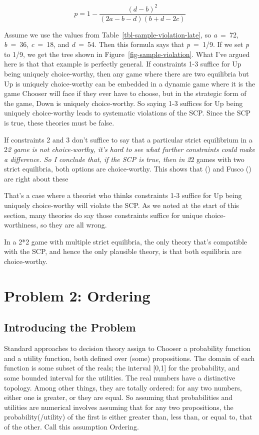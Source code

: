\documentclass[
  10pt,
  letterpaper,
  DIV=11,
  numbers=noendperiod,
  twoside]{scrartcl}
\begin{document}
\[
p = 1 - \frac{(d-b)^2}{(2a-b-d)(b+d-2c)}
\]

Assume we use the values from Table~\ref{tbl-sample-violation-late}, so
\emph{a}~=~72, \emph{b}~=~36, \emph{c}~=~18, and \emph{d}~=~54. Then
this formula says that \emph{p}~=~1/9. If we set \emph{p} to 1/9, we get
the tree shown in Figure~\ref{fig-sample-violation}. What I've argued
here is that that example is perfectly general. If constraints 1-3
suffice for Up being uniquely choice-worthy, then any game where there
are two equilibria but Up is uniquely choice-worthy can be embedded in a
dynamic game where it is the game Chooser will face if they ever have to
choose, but in the strategic form of the game, Down is uniquely
choice-worthy. So saying 1-3 suffices for Up being uniquely
choice-worthy leads to systematic violations of the SCP. Since the SCP
is true, these theories must be false.

If constraints 2 and 3 don't suffice to say that a particular strict
equilibrium in a 2\emph{2 game is not choice-worthy, it's hard to see
what further constraints could make a difference. So I conclude that, if
the SCP is true, then in 2}2 games with two strict equilibria, both
options are choice-worthy. This shows that
() and Fusco
() are right about these

That's a case where a theorist who thinks constraints 1-3 suffice for Up
being uniquely choice-worthy will violate the SCP. As we noted at the
start of this section, many theories do say those constraints suffice
for unique choice-worthiness, so they are all wrong.

In a 2*2 game with multiple strict equilibria, the only theory that's
compatible with the SCP, and hence the only plausible theory, is that
both equilibria are choice-worthy.

\section{Problem 2: Ordering}\label{sec-ordering}

\subsection{Introducing the Problem}\label{sec-ordering-intro}

Standard approaches to decision theory assign to Chooser a probability
function and a utility function, both defined over (some) propositions.
The domain of each function is some subset of the reals; the interval
{[}0,1{]} for the probability, and some bounded interval for the
utilities. The real numbers have a distinctive topology. Among other
things, they are totally ordered: for any two numbers, either one is
greater, or they are equal. So assuming that probabilities and utilities
are numerical involves assuming that for any two propositions, the
probability(/utility) of the first is either greater than, less than, or
equal to, that of the other. Call this assumption Ordering.
\end{document}
